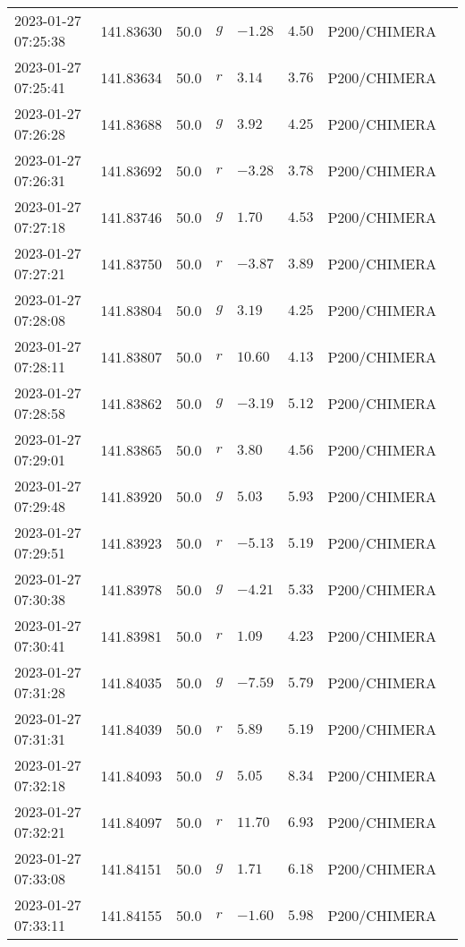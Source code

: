\documentclass{nature_plusfigure}
\begin{document}
\begin{supplement}
\begin{center}
\begin{longtable}{llllllll}
2023-01-27 07:25:38 & 141.83630 & 50.0 & $g$ & $-1.28$ & $4.50$ & P200/CHIMERA &  \\ 
2023-01-27 07:25:41 & 141.83634 & 50.0 & $r$ & $3.14$ & $3.76$ & P200/CHIMERA &  \\ 
2023-01-27 07:26:28 & 141.83688 & 50.0 & $g$ & $3.92$ & $4.25$ & P200/CHIMERA &  \\ 
2023-01-27 07:26:31 & 141.83692 & 50.0 & $r$ & $-3.28$ & $3.78$ & P200/CHIMERA &  \\ 
2023-01-27 07:27:18 & 141.83746 & 50.0 & $g$ & $1.70$ & $4.53$ & P200/CHIMERA &  \\ 
2023-01-27 07:27:21 & 141.83750 & 50.0 & $r$ & $-3.87$ & $3.89$ & P200/CHIMERA &  \\ 
2023-01-27 07:28:08 & 141.83804 & 50.0 & $g$ & $3.19$ & $4.25$ & P200/CHIMERA &  \\ 
2023-01-27 07:28:11 & 141.83807 & 50.0 & $r$ & $10.60$ & $4.13$ & P200/CHIMERA &  \\ 
2023-01-27 07:28:58 & 141.83862 & 50.0 & $g$ & $-3.19$ & $5.12$ & P200/CHIMERA &  \\ 
2023-01-27 07:29:01 & 141.83865 & 50.0 & $r$ & $3.80$ & $4.56$ & P200/CHIMERA &  \\ 
2023-01-27 07:29:48 & 141.83920 & 50.0 & $g$ & $5.03$ & $5.93$ & P200/CHIMERA &  \\ 
2023-01-27 07:29:51 & 141.83923 & 50.0 & $r$ & $-5.13$ & $5.19$ & P200/CHIMERA &  \\ 
2023-01-27 07:30:38 & 141.83978 & 50.0 & $g$ & $-4.21$ & $5.33$ & P200/CHIMERA &  \\ 
2023-01-27 07:30:41 & 141.83981 & 50.0 & $r$ & $1.09$ & $4.23$ & P200/CHIMERA &  \\ 
2023-01-27 07:31:28 & 141.84035 & 50.0 & $g$ & $-7.59$ & $5.79$ & P200/CHIMERA &  \\ 
2023-01-27 07:31:31 & 141.84039 & 50.0 & $r$ & $5.89$ & $5.19$ & P200/CHIMERA &  \\ 
2023-01-27 07:32:18 & 141.84093 & 50.0 & $g$ & $5.05$ & $8.34$ & P200/CHIMERA &  \\ 
2023-01-27 07:32:21 & 141.84097 & 50.0 & $r$ & $11.70$ & $6.93$ & P200/CHIMERA &  \\ 
2023-01-27 07:33:08 & 141.84151 & 50.0 & $g$ & $1.71$ & $6.18$ & P200/CHIMERA &  \\ 
2023-01-27 07:33:11 & 141.84155 & 50.0 & $r$ & $-1.60$ & $5.98$ & P200/CHIMERA &  \\ 
\hline 
\end{longtable} 
\end{center} 




\end{supplement}
\end{document}
